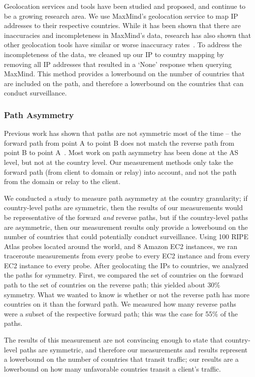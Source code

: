 Geolocation services and tools have been studied and proposed, and continue to be a growing research area.  We use MaxMind's geolocation service to map IP addresses to their respective countries.  While it has been shown that there are inaccuracies and incompleteness in MaxMind's data, research has also shown that other geolocation tools have similar or worse inaccuracy rates~\cite{huffaker2011geocompare}.  To address the incompleteness of the data, we cleaned up our IP to country mapping by removing all IP addresses that resulted in a `None' response when querying MaxMind.  This method provides a lowerbound on the number of countries that are included on the path, and therefore a lowerbound on the countries that can conduct surveillance.  

\subsubsection{Path Asymmetry}
Previous work has shown that paths are not symmetric most of the time -- the forward path from point A to point B does not match the reverse path from point B to point A~\cite{he2005routing}.  Most work on path asymmetry has been done at the AS level, but not at the country level.  Our measurement methods only take the forward path (from client to domain or relay) into account, and not the path from the domain or relay to the client.  

We conducted a study to measure path asymmetry at the country granularity; if country-level paths are symmetric, then the results of our measurements would be representative of the forward {\it and} reverse paths, but if the country-level paths are asymmetric, then our measurement results only provide a lowerbound on the number of countries that could potentially conduct surveillance.  Using 100 RIPE Atlas probes located around the world, and 8 Amazon EC2 instances, we ran traceroute measurements from every probe to every EC2 instance and from every EC2 instance to every probe.  After geolocating the IPs to countries, we analyzed the paths for symmetry.  First, we compared the set of countries on the forward path to the set of countries on the reverse path; this yielded about 30\% symmetry.  What we wanted to know is whether or not the reverse path has more countries on it than the forward path.  We measured how many reverse paths were a subset of the respective forward path; this was the case for 55\% of the paths.  

The results of this measurement are not convincing enough to state that country-level paths are symmetric, and therefore our measurements and results represent a lowerbound on the number of countries that transit traffic; our results are a lowerbound on how many unfavorable countries transit a client's traffic.

